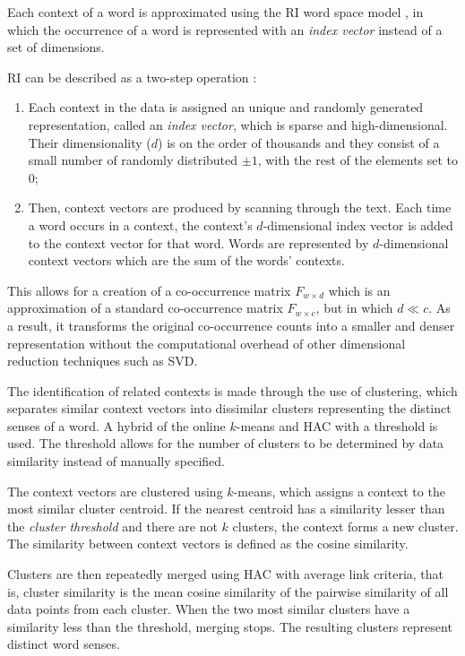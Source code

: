 Each context of a word is approximated using the \ac{RI} word space model
\cite{kanerva2000random}, in which the occurrence of a word is represented with
an \textit{index vector} instead of a set of dimensions.

\ac{RI} can be described as a two-step operation
\cite{sahlgren2005introduction}:

\begin{enumerate}
 \item Each context in the data is assigned an unique and randomly generated
 representation, called an \textit{index vector}, which is sparse and
 high-dimensional. Their dimensionality ($d$) is on the order of thousands and
 they consist of a small number of randomly distributed $\pm1$, with the rest
 of the elements set to $0$;
 \item Then, context vectors are produced by scanning through the text. Each
 time a word occurs in a context, the context's $d$-dimensional index vector is
 added to the context vector for that word. Words are represented by
 $d$-dimensional context vectors which are the sum of the words' contexts.
\end{enumerate}

This allows for a creation of a co-occurrence matrix $F_{w \times d}$ which is
an approximation of a standard co-occurrence matrix $F_{w \times c}$, but in
which $d \ll c$. As a result, it transforms the original co-occurrence counts
into a smaller and denser representation without the computational overhead of
other dimensional reduction techniques such as \ac{SVD}.

The identification of related contexts is made through the use of clustering,
which separates similar context vectors into dissimilar clusters representing
the distinct senses of a word. A hybrid of the online $k$-means and \ac{HAC}
with a threshold is used. The threshold allows for the number of clusters to be
determined by data similarity instead of manually specified.

The context vectors are clustered using $k$-means, which assigns a context to
the most similar cluster centroid. If the nearest centroid has a similarity
lesser than the \textit{cluster threshold} and there are not $k$ clusters, the
context forms a new cluster. The similarity between context vectors is defined
as the cosine similarity.

Clusters are then repeatedly merged using \ac{HAC} with average link criteria,
that is, cluster similarity is the mean cosine similarity of the pairwise
similarity of all data points from each cluster. When the two most similar
clusters have a similarity less than the threshold, merging stops. The resulting
clusters represent distinct word senses.

